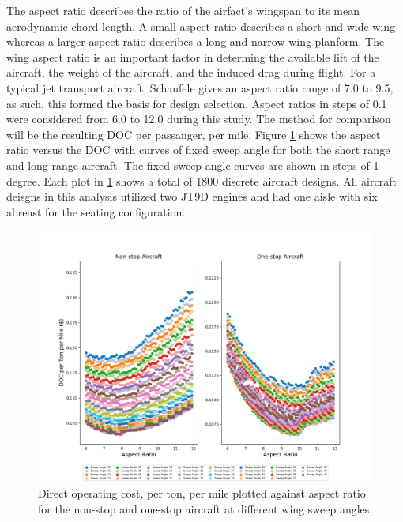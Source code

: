 \documentclass{article}
\begin{document}
        \begin{flushleft}
            The aspect ratio describes the ratio of the airfact's wingspan to
            its mean aerodynamic chord length. A small aspect ratio describes a
            short and wide wing whereas a larger aspect ratio describes a long
            and narrow wing planform. The wing aspect ratio is an important
            factor in determing the available lift of the aircraft, the weight
            of the aircraft, and the induced drag during flight. For a typical
            jet transport aircraft, Schaufele gives an aspect ratio range of 7.0
            to 9.5, as such, this formed the basis for design selection. Aspect
            ratios in steps of 0.1 were considered from 6.0 to 12.0 during this
            study. The method for comparison will be the resulting DOC per
            passanger, per mile. Figure \ref{fig:doctmAR} shows the aspect ratio
            versus the DOC with curves of fixed sweep angle for both the short
            range and long range aircraft. The fixed sweep angle curves are
            shown in steps of 1 degree. Each plot in \ref{fig:doctmAR} shows a
            total of 1800 discrete aircraft designs. All aircraft deisgns in
            this analysis utilized two JT9D engines and had one aisle with six
            abreast for the seating configuration.

            \begin{figure}[ht]
                \centering
                \includegraphics[scale=0.54]{DOCTM v Sweep Angle.PNG}
                \caption{Direct operating cost, per ton, per mile plotted against aspect ratio for the non-stop and one-stop aircraft at different wing sweep angles.}
                \label{fig:doctmAR}
            \end{figure}


\end{flushleft}
\end{document}
